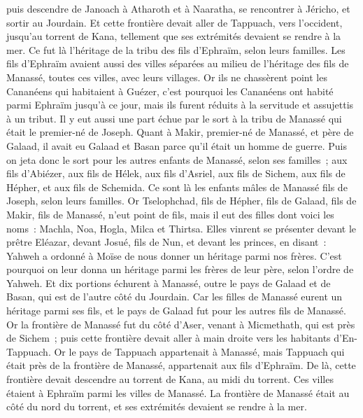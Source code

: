 \begin{multicols}{2}
puis descendre de Janoach à Atharoth et à Naaratha, se rencontrer à Jéricho, et sortir au Jourdain.
Et cette frontière devait aller de Tappuach, vers l'occident, jusqu'au torrent de Kana, tellement que ses extrémités devaient se rendre à la mer. Ce fut là l'héritage de la tribu des fils d'Ephraïm, selon leurs familles.
Les fils d'Ephraïm avaient aussi des villes séparées au milieu de l'héritage des fils de Manassé, toutes ces villes, avec leurs villages.
Or ils ne chassèrent point les Cananéens qui habitaient à Guézer, c'est pourquoi les Cananéens ont habité parmi Ephraïm jusqu'à ce jour, mais ils furent réduits à la servitude et assujettis à un tribut.
\VerseOne{}Il y eut aussi une part échue par le sort à la tribu de Manassé qui était le premier-né de Joseph. Quant à Makir, premier-né de Manassé, et père de Galaad, il avait eu Galaad et Basan parce qu'il était un homme de guerre.
Puis on jeta donc le sort pour les autres enfants de Manassé, selon ses familles~; aux fils d'Abiézer, aux fils de Hélek, aux fils d'Asriel, aux fils de Sichem, aux fils de Hépher, et aux fils de Schemida. Ce sont là les enfants mâles de Manassé fils de Joseph, selon leurs familles.
Or Tselophchad, fils de Hépher, fils de Galaad, fils de Makir, fils de Manassé, n'eut point de fils, mais il eut des filles dont voici les noms~: Machla, Noa, Hogla, Milca et Thirtsa.
Elles vinrent se présenter devant le prêtre Eléazar, devant Josué, fils de Nun, et devant les princes, en disant~: Yahweh a ordonné à Moïse de nous donner un héritage parmi nos frères. C'est pourquoi on leur donna un héritage parmi les frères de leur père, selon l'ordre de Yahweh.
Et dix portions échurent à Manassé, outre le pays de Galaad et de Basan, qui est de l'autre côté du Jourdain.
Car les filles de Manassé eurent un héritage parmi ses fils, et le pays de Galaad fut pour les autres fils de Manassé.
Or la frontière de Manassé fut du côté d'Aser, venant à Micmethath, qui est près de Sichem~; puis cette frontière devait aller à main droite vers les habitants d'En-Tappuach.
Or le pays de Tappuach appartenait à Manassé, mais Tappuach qui était près de la frontière de Manassé, appartenait aux fils d'Ephraïm.
De là, cette frontière devait descendre au torrent de Kana, au midi du torrent. Ces villes étaient à Ephraïm parmi les villes de Manassé. La frontière de Manassé était au côté du nord du torrent, et ses extrémités devaient se rendre à la mer.

\end{multicols}
